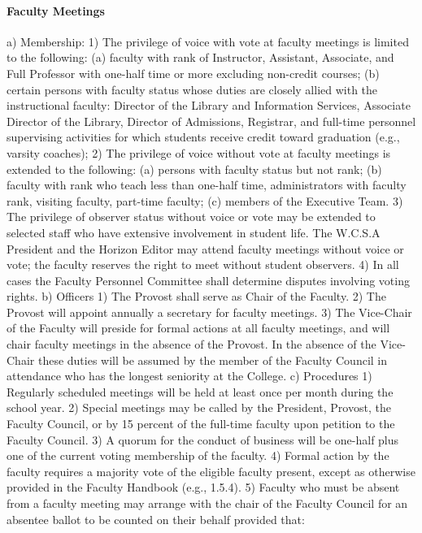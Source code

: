 \documentclass[letterpaper, 11pt]{article}
\begin{document}
			\paragraph{Faculty Meetings}
				a) Membership:
				1) The privilege of voice with vote at faculty meetings is limited to the following:
				(a) faculty with rank of Instructor, Assistant, Associate, and Full Professor with one-half time or more excluding non-credit courses;
				(b) certain persons with faculty status whose duties are closely allied with the instructional faculty:  Director of the Library and Information Services, Associate Director of the Library, Director of Admissions, Registrar, and full-time personnel supervising activities for which students receive credit toward graduation (e.g., varsity coaches);
				2) The privilege of voice without vote at faculty meetings is extended to the following:
				(a) persons with faculty status but not rank;
				(b) faculty with rank who teach less than one-half time, administrators with faculty rank, visiting faculty, part-time faculty;
				(c) members of the Executive Team.
				3) The privilege of observer status without voice or vote may be extended to selected staff who have extensive involvement in student life.  The W.C.S.A President and the Horizon Editor may attend faculty meetings without voice or vote; the faculty reserves the right to meet without student observers.
				4) In all cases the Faculty Personnel Committee shall determine disputes involving voting rights.
				b) Officers
				1) The Provost shall serve as Chair of the Faculty.
				2) The Provost will appoint annually a secretary for faculty meetings.
				3) The Vice-Chair of the Faculty will preside for formal actions at all faculty meetings, and will chair faculty meetings in the absence of the Provost.  In the absence of the Vice-Chair these duties will be assumed by the member of the Faculty Council in attendance who has the longest seniority at the College.
				c) Procedures
				1) Regularly scheduled meetings will be held at least once per month during the school year.
				2) Special meetings may be called by the President, Provost, the Faculty Council, or by 15 percent of the full-time faculty upon petition to the Faculty Council.
				3) A quorum for the conduct of business will be one-half plus one of the current voting membership of the faculty.
				4) Formal action by the faculty requires a majority vote of the eligible faculty present, except as otherwise provided in the Faculty Handbook (e.g., 1.5.4).
				5) Faculty who must be absent from a faculty meeting may arrange with the chair of the Faculty Council for an absentee ballot to be counted on their behalf provided that:
\end{document}
